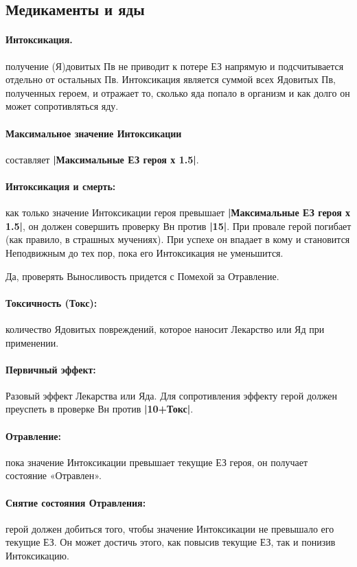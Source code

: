 \subsection{Медикаменты и яды}
\paragraph{Интоксикация.} получение (Я)довитых Пв не приводит к потере ЕЗ напрямую и подсчитывается отдельно от остальных Пв. Интоксикация является суммой всех Ядовитых Пв, полученных героем, и отражает то, сколько яда попало в организм и как долго он может сопротивляться яду.
\paragraph{Максимальное значение Интоксикации} составляет \textbf{|Максимальные ЕЗ героя х 1.5|}. 
\paragraph{Интоксикация и смерть:} как только значение Интоксикации героя превышает \textbf{|Максимальные ЕЗ героя х 1.5|}, он должен совершить проверку Вн против \textbf{|15|}. При провале герой погибает (как правило, в страшных мучениях). При успехе он впадает в кому и становится Неподвижным до тех пор, пока его Интоксикация не уменьшится.
\begin{tcolorbox}
    Да, проверять Выносливость придется с Помехой за Отравление.
\end{tcolorbox}
\paragraph{Токсичность (Токс):} количество Ядовитых повреждений, которое наносит Лекарство или Яд при применении.
\paragraph{Первичный эффект:} Разовый эффект Лекарства или Яда. Для сопротивления эффекту герой должен преуспеть в проверке Вн против \textbf{|10+Токс|}.
\paragraph{Отравление:} пока значение Интоксикации превышает текущие ЕЗ героя, он получает состояние «Отравлен». 
\paragraph{Снятие состояния Отравления:} герой должен добиться того, чтобы значение Интоксикации не превышало его текущие ЕЗ. Он может достичь этого, как повысив текущие ЕЗ, так и понизив Интоксикацию.
